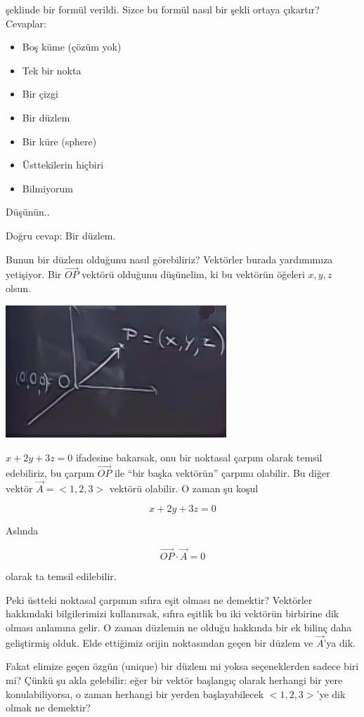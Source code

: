 \documentclass[12pt,fleqn]{article}\usepackage{../../common}
\begin{document}
şeklinde bir formül verildi. Sizce bu formül nasıl bir şekli ortaya çıkartır?
Cevaplar:

\begin{itemize}
   \item Boş küme (çözüm yok)
   \item Tek bir nokta
   \item Bir çizgi
   \item Bir düzlem
   \item Bir küre (sphere)
   \item Üsttekilerin hiçbiri
   \item Bilmiyorum
\end{itemize}

Düşünün.. 

Doğru cevap:  Bir düzlem. 

Bunun bir düzlem olduğunu nasıl görebiliriz? Vektörler burada yardımımıza
yetişiyor. Bir $\vec{OP}$ vektörü olduğunu düşünelim, ki bu vektörün öğeleri
$x,y,z$ olsun.

\includegraphics[height=5cm]{1_14.png}

$x + 2y + 3z = 0$ ifadesine bakarsak, onu bir noktasal çarpım olarak temsil
edebiliriz, bu çarpım $\vec{OP}$ ile ``bir başka vektörün'' çarpımı
olabilir. Bu diğer vektör $\vec{A} = <1,2,3>$ vektörü olabilir. O zaman şu koşul

$$ x + 2y + 3z = 0 $$

Aslında

$$ \vec{OP} \cdot \vec{A} = 0 $$

olarak ta temsil edilebilir.

Peki üstteki noktasal çarpımın sıfıra eşit olması ne demektir? Vektörler
hakkındaki bilgilerimizi kullanırsak, sıfıra eşitlik bu iki vektörün
birbirine dik olması anlamına gelir. O zaman düzlemin ne olduğu hakkında
bir ek bilinç daha geliştirmiş olduk. Elde ettiğimiz orijin noktasından
geçen bir düzlem ve $\vec{A}$'ya dik. 

Fakat elimize geçen özgün (unique) bir düzlem mi yoksa seçeneklerden sadece
biri mi? Çünkü şu akla gelebilir: eğer bir vektör başlangıç olarak herhangi
bir yere konulabiliyorsa, o zaman herhangi bir yerden başlayabilecek
$< 1,2,3 >$'ye dik olmak ne demektir?
\end{document}
